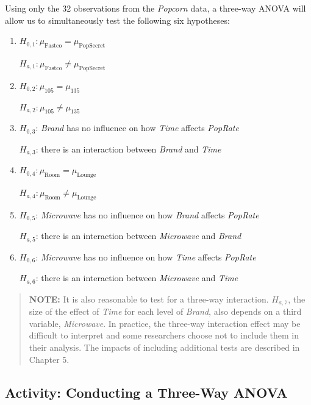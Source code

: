 \documentclass[
]{book}
\begin{document}
Using only the 32 observations from the \emph{Popcorn} data, a three-way ANOVA will allow us to simultaneously test the following six hypotheses:

\begin{enumerate}
\def\labelenumi{\arabic{enumi}.}
\item
  \(H_{0,1}: \mu_{\text{Fastco}} = \mu_{\text{PopSecret}}\)

  \(H_{a,1}: \mu_{\text{Fastco}} \ne \mu_{\text{PopSecret}}\)
\item
  \(H_{0,2}: \mu_{105} = \mu_{135}\)

  \(H_{a,2}: \mu_{105} \ne \mu_{135}\)
\item
  \(H_{0,3}\): \emph{Brand} has no influence on how \emph{Time} affects \emph{PopRate}

  \(H_{a,3}\): there is an interaction between \emph{Brand} and \emph{Time}
\item
  \(H_{0,4}: \mu_{\text{Room}} = \mu_{\text{Lounge}}\)

  \(H_{a,4}: \mu_{\text{Room}} \ne \mu_{\text{Lounge}}\)
\item
  \(H_{0,5}\): \emph{Microwave} has no influence on how \emph{Brand} affects \emph{PopRate}

  \(H_{a,5}\): there is an interaction between \emph{Microwave} and \emph{Brand}
\item
  \(H_{0,6}\): \emph{Microwave} has no influence on how \emph{Time} affects \emph{PopRate}

  \(H_{a,6}\): there is an interaction between \emph{Microwave} and \emph{Time}
\end{enumerate}

\begin{quote}
\textbf{NOTE:} It is also reasonable to test for a three-way interaction. \(H_{a,7}\), the size of the effect of \emph{Time} for each level of \emph{Brand}, also depends on a third variable, \emph{Microwave}. In practice, the three-way interaction effect may be difficult to interpret and some researchers choose not to include them in their analysis. The impacts of including additional tests are described in Chapter 5.
\end{quote}

\hypertarget{activity-conducting-a-three-way-anova}{%
\subsection*{Activity: Conducting a Three-Way ANOVA}\label{activity-conducting-a-three-way-anova}}
\end{document}
